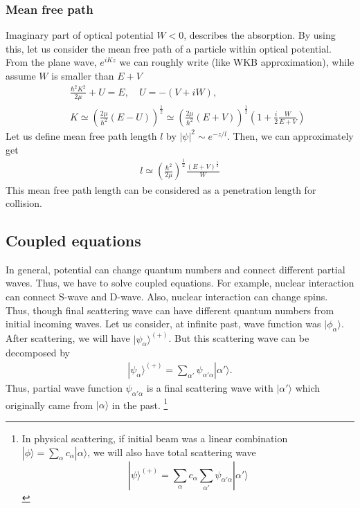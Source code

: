 \documentclass[10pt]{book}
\newcommand{\bea}{\begin{eqnarray}}
\newcommand{\eea}{\end{eqnarray}}
\newcommand{\no}{\nonumber \\}
\def\ra{\rangle}
\begin{document}
\subsubsection{Mean free path}
Imaginary part of optical potential $W<0$, describes the absorption. By using this, let us 
consider the mean free path of a particle within optical potential. 
From the plane wave, $e^{iKz}$ we can roughly write (like WKB approximation),
while assume $W$ is smaller than $E+V$
\bea 
& &\frac{\hbar^2 K^2}{2\mu}+U=E, \quad U = -(V+i W),\no 
& &K \simeq \left(\frac{2\mu}{\hbar^2}(E-U)\right)^{\frac{1}{2}} 
           \simeq \left(\frac{2\mu}{\hbar^2}(E+V)\right)^{\frac{1}{2}} 
                  \left(1+ \frac{i}{2}\frac{ W}{E+V}\right)
\eea 
Let us define mean free path length $l$ by $|\psi|^2 \sim e^{-z/l}$. 
Then, we can approximately get
\bea 
l\simeq \left(\frac{\hbar^2}{2\mu}\right)^{\frac{1}{2}}\frac{(E+V)^{\frac{1}{2}}}{W}
\eea 
This mean free path length can be considered as a penetration length for collision. 


\subsection{Coupled equations}
In general, potential can change quantum numbers and 
connect different partial waves. Thus, we have to solve
coupled equations. For example, nuclear interaction
can connect S-wave and D-wave. Also, nuclear interaction can 
change spins. Thus, though final scattering wave
can have different quantum numbers from initial incoming waves. 
Let us consider, at infinite past, wave function was
$|\phi_\alpha\ra$. After scattering, we will have
$|\psi_\alpha\ra^{(+)}$. But this scattering wave can be
decomposed by
\bea
|\psi_\alpha\ra^{(+)}=\sum_{\alpha'}\psi_{\alpha'\alpha}|\alpha'\ra.
\eea 
Thus, partial wave function $\psi_{\alpha'\alpha}$ is a
final scattering wave with $|\alpha'\ra$ which originally 
came from $|\alpha\ra$ in the past.
\footnote{In physical scattering, if initial beam was a
linear combination $|\phi\ra=\sum_{\alpha}c_\alpha |\alpha\ra$,
we will also have total scattering wave
$$|\psi\ra^{(+)}=
\sum_{\alpha} c_\alpha \sum_{\alpha'} \psi_{\alpha'\alpha}|\alpha'\ra$$
}
\end{document}
